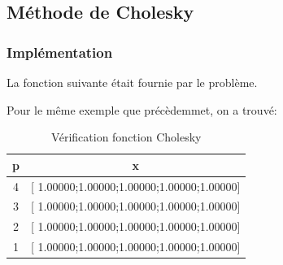 \documentclass[a4paper,11pt]{article}
\begin{document}





\newpage
\subsection{Méthode de Cholesky}
\subsubsection{Implémentation}

La fonction suivante était fournie par le problème. 
\begin{multicols}{2}
  
\end{multicols}

Pour le même exemple que précèdemmet, on a trouvé:

\begin{table}[h!]
  \begin{center}
    \begin{tabular}{|c|c|}
      \hline 
      p & x \\
      \hline 
      \hline 
      4 & [ 1.00000;1.00000;1.00000;1.00000;1.00000]\\
      3 & [ 1.00000;1.00000;1.00000;1.00000;1.00000]\\
      2 & [ 1.00000;1.00000;1.00000;1.00000;1.00000]\\
      1 & [ 1.00000;1.00000;1.00000;1.00000;1.00000]\\
      \hline 
    \end{tabular}
  \end{center}
  \caption{Vérification fonction Cholesky}
\end{table}
\end{document}
